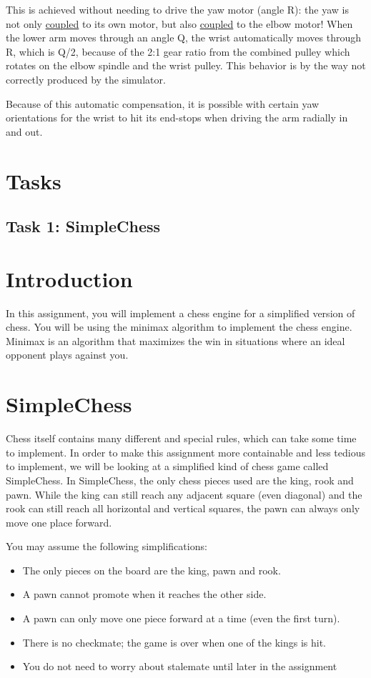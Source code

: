 \documentclass[10pt]{scrartcl}
\begin{document}
This is achieved without needing to drive the yaw motor (angle R): the
yaw is not only \underline{coupled} to its own motor, but also
\underline{coupled} to the elbow motor! When the lower arm moves through
an angle Q, the wrist automatically moves through R, which is Q/2,
because of the 2:1 gear ratio from the combined pulley which rotates on
the elbow spindle and the wrist pulley. This behavior is by the way not
correctly produced by the simulator.

Because of this automatic compensation, it is possible with certain yaw
orientations for the wrist to hit its end-stops when driving the arm
radially in and out.

\section{Tasks}
\label{sec:Tasks}
\subsection{Task 1: SimpleChess}
\label{sec:SimpleChess}

\section*{Introduction}
In this assignment, you will implement a chess engine for a simplified version of chess. You will be using the minimax algorithm to implement the chess engine. Minimax is an algorithm that maximizes the win in situations where an ideal opponent plays against you.  

\section*{SimpleChess}
Chess itself contains many different and special rules, which can take some time to implement. In order to make this assignment more containable and less tedious to implement, we will be looking at a simplified kind of chess game called SimpleChess. In SimpleChess, the only chess pieces used are the king, rook and pawn. While the king can still reach any adjacent square (even diagonal) and the rook can still reach all horizontal and vertical squares, the pawn can always only move one place forward.

You may assume the following simplifications:
\begin{itemize}
    \item The only pieces on the board are the king, pawn and rook.
    \item A pawn cannot promote when it reaches the other side.
    \item A pawn can only move one piece forward at a time (even the first turn).
    \item There is no checkmate; the game is over when one of the kings is hit.
    \item You do not need to worry about stalemate until later in the assignment
\end{itemize}
\end{document}
